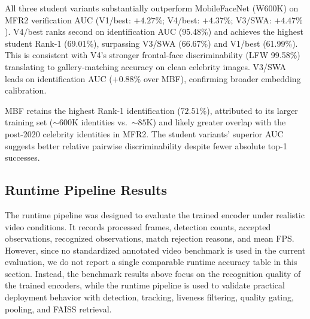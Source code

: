 All three student variants substantially outperform MobileFaceNet (W600K) on MFR2 verification AUC (V1/best: $+4.27\%$; V4/best: $+4.37\%$; V3/SWA: $+4.47\%$). V4/best ranks second on identification AUC (95.48\%) and achieves the highest student Rank-1 (69.01\%), surpassing V3/SWA (66.67\%) and V1/best (61.99\%). This is consistent with V4's stronger frontal-face discriminability (LFW 99.58\%) translating to gallery-matching accuracy on clean celebrity images. V3/SWA leads on identification AUC ($+0.88\%$ over MBF), confirming broader embedding calibration.

MBF retains the highest Rank-1 identification ($72.51\%$), attributed to its larger training set ($\sim\!600$K identities vs.\ $\sim\!85$K) and likely greater overlap with the post-2020 celebrity identities in MFR2. The student variants' superior AUC suggests better relative pairwise discriminability despite fewer absolute top-1 successes.

\subsection{Runtime Pipeline Results}

The runtime pipeline was designed to evaluate the trained encoder under realistic video conditions. It records processed frames, detection counts, accepted observations, recognized observations, match rejection reasons, and mean FPS. However, since no standardized annotated video benchmark is used in the current evaluation, we do not report a single comparable runtime accuracy table in this section. Instead, the benchmark results above focus on the recognition quality of the trained encoders, while the runtime pipeline is used to validate practical deployment behavior with detection, tracking, liveness filtering, quality gating, pooling, and FAISS retrieval\cite{faiss}.